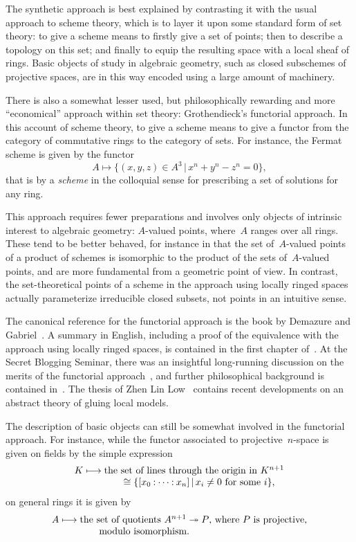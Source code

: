 \documentclass[10pt,reqno,a4paper]{amsbook}
\theoremstyle{definition}
\theoremstyle{plain}
\theoremstyle{remark}
\newcommand{\?}{\,{:}\,}
\newcommand{\hg}{\mathbin{:}}  %
\renewcommand{\_}{\mathpunct{.}\,}
\begin{document}
{The synthetic approach is best explained by contrasting it with the usual
approach to scheme theory, which is to layer it upon some standard form of set theory:
to give a scheme means to firstly give a set of points; then
to describe a topology on this set; and finally to equip the resulting space
with a local sheaf of rings. Basic objects of study in algebraic geometry, such
as closed subschemes of projective spaces, are in this way encoded using a large
amount of machinery.

There is also a somewhat lesser used, but philosophically rewarding and more
``economical'' approach within set theory: Grothendieck's functorial approach.
In this account of scheme theory, to give a scheme means to give a functor
from the category of commutative rings to the category of sets. For instance,
the Fermat scheme is given by the functor
\[ A \longmapsto \{ (x,y,z) \in A^3 \,|\, x^n + y^n - z^n = 0 \}, \]
that is by a \emph{scheme} in the colloquial sense for prescribing a set of
solutions for any ring.

This approach requires fewer preparations and involves
only objects of intrinsic interest to algebraic geometry: $A$-valued points,
where~$A$ ranges over all rings. These tend to be better behaved, for instance in
that the set of~$A$-valued points of a product of schemes is isomorphic to the
product of the sets of~$A$-valued points, and are more fundamental from a
geometric point of view. In contrast, the set-theoretical points of a scheme in
the approach using locally ringed spaces actually parameterize irreducible
closed subsets, not points in an intuitive sense.

The canonical reference for the functorial approach is the book by Demazure and
Gabriel~\cite{demazure:gabriel}. A summary in English, including a proof of the
equivalence with the approach using locally ringed spaces, is contained in the
first chapter of~\cite{vezzani:fun}. At the Secret Blogging Seminar, there was
an insightful long-running discussion on the merits of the functorial
approach~\cite{secret-blogging-seminar:fpov}, and further philosophical background
is contained in~\cite{mclarty:ontology}. The thesis of Zhen Lin Low~\cite{low:local-models}
contains recent developments on an abstract theory of gluing local models.

The description of basic objects can still be somewhat involved in the
functorial approach. For instance, while the functor associated to
projective~$n$-space is given on fields by the simple expression
\[ \begin{array}{r@{}c@{}l}
  K &{}\longmapsto{}& \text{the set of lines through the origin in~$K^{n+1}$} \\
  && \qquad \cong \{ [x_0 \hg \cdots \hg x_n] \,|\, \text{$x_i \neq 0$ for some~$i$} \},
\end{array} \]
on general rings it is given by
\[ \begin{array}{r@{}c@{}l}
  A &{}\longmapsto{}& \text{the set of quotients~$A^{n+1} \twoheadrightarrow P$,
  where~$P$ is projective,} \\
  && \qquad \text{modulo isomorphism}.
\end{array} \]

}
\end{document}
